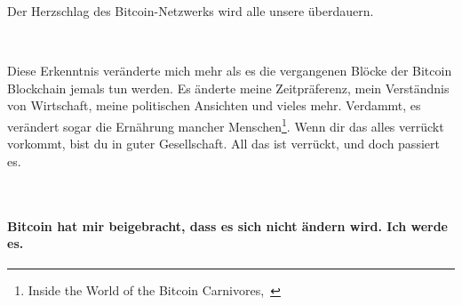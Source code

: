 Der Herzschlag des Bitcoin-Netzwerks wird alle unsere überdauern.

~

Diese Erkenntnis veränderte mich mehr als es die vergangenen Blöcke der
Bitcoin Blockchain jemals tun werden. Es änderte meine Zeitpräferenz, mein
Verständnis von Wirtschaft, meine politischen Ansichten und vieles mehr.
Verdammt, es verändert sogar die Ernährung mancher Menschen\footnote{Inside the
World of the Bitcoin Carnivores,~\cite{carnivores}}. Wenn dir das alles verrückt
vorkommt, bist du in guter Gesellschaft. All das ist verrückt, und doch passiert
es.

~

\paragraph{Bitcoin hat mir beigebracht, dass es sich nicht ändern wird. Ich werde es.}

%
%
%
%
%
%
%
%
%
